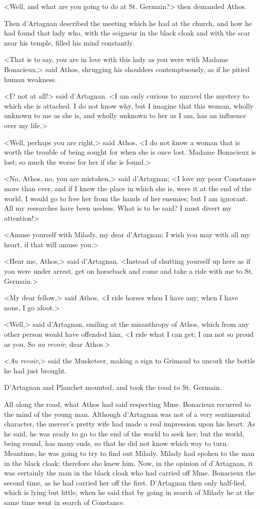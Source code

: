 <Well, and what are you going to do at St. Germain?> then demanded Athos. 

Then d'Artagnan described the meeting which he had at the church, and how he had found that lady who, with the seigneur in the black cloak and with the scar near his temple, filled his mind constantly. 

<That is to say, you are in love with this lady as you were with Madame Bonacieux,> said Athos, shrugging his shoulders contemptuously, as if he pitied human weakness. 

<I? not at all!> said d'Artagnan. <I am only curious to unravel the mystery to which she is attached. I do not know why, but I imagine that this woman, wholly unknown to me as she is, and wholly unknown to her as I am, has an influence over my life.> 

<Well, perhaps you are right,> said Athos. <I do not know a woman that is worth the trouble of being sought for when she is once lost. Madame Bonacieux is lost; so much the worse for her if she is found.> 

<No, Athos, no, you are mistaken,> said d'Artagnan; <I love my poor Constance more than ever, and if I knew the place in which she is, were it at the end of the world, I would go to free her from the hands of her enemies; but I am ignorant. All my researches have been useless. What is to be said? I must divert my attention!> 

<Amuse yourself with Milady, my dear d'Artagnan; I wish you may with all my heart, if that will amuse you.> 

<Hear me, Athos,> said d'Artagnan. <Instead of shutting yourself up here as if you were under arrest, get on horseback and come and take a ride with me to St. Germain.> 

<My dear fellow,> said Athos, <I ride horses when I have any; when I have none, I go afoot.> 

<Well,> said d'Artagnan, smiling at the misanthropy of Athos, which from any other person would have offended him, <I ride what I can get; I am not so proud as you. So \textit{au revoir}, dear Athos.> 

<\textit{Au revoir},> said the Musketeer, making a sign to Grimaud to uncork the bottle he had just brought. 

D'Artagnan and Planchet mounted, and took the road to St. Germain. 

All along the road, what Athos had said respecting Mme. Bonacieux recurred to the mind of the young man. Although d'Artagnan was not of a very sentimental character, the mercer's pretty wife had made a real impression upon his heart. As he said, he was ready to go to the end of the world to seek her; but the world, being round, has many ends, so that he did not know which way to turn. Meantime, he was going to try to find out Milady. Milady had spoken to the man in the black cloak; therefore she knew him. Now, in the opinion of d'Artagnan, it was certainly the man in the black cloak who had carried off Mme. Bonacieux the second time, as he had carried her off the first. D'Artagnan then only half-lied, which is lying but little, when he said that by going in search of Milady he at the same time went in search of Constance. 


